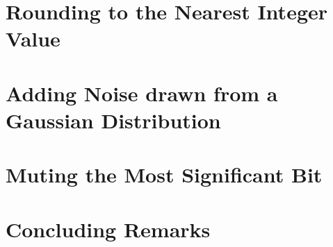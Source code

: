 \documentclass[12pt,letterpaper]{article}
\begin{document}

\section*{Rounding to the Nearest Integer Value}



\section*{Adding Noise drawn from a Gaussian Distribution}



\section*{Muting the Most Significant Bit}



\section*{Concluding Remarks}


\end{document}
